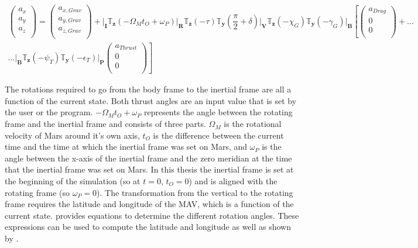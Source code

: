 \begin{multline} \label{eq:accModel}
\begin{pmatrix}
a_{x}\\
a_{y}\\
a_{z}\\
\end{pmatrix}
=
\begin{pmatrix}
a_{x,Grav}\\
a_{y,Grav}\\
a_{z,Grav}\\
\end{pmatrix}+
\Bigg|_{\mathbf{I}}\mathbb{T}_{\mathbf{z}}\left(-\Omega_{M}t_{O}+\omega_{P}\right)\Bigg|_{\mathbf{R}}\mathbb{T}_{\mathbf{z}}\left(-\tau\right)\mathbb{T}_{\mathbf{y}}\left(\dfrac{\pi}{2}+\delta\right)\Bigg|_{\mathbf{V}}\mathbb{T}_{\mathbf{z}}\left(-\chi_{G}\right)\mathbb{T}_{\mathbf{y}}\left(-\gamma_{G}\right)\Bigg|_{\mathbf{B}}\left[
\begin{pmatrix}
a_{Drag}\\
0\\
0\\
\end{pmatrix}
+  \right. \dots \\
\dotsc
 \left.
\Bigg|_{\mathbf{B}}\mathbb{T}_{\mathbf{z}}\left(-\psi_{T}\right)\mathbb{T}_{\mathbf{y}}\left(-\epsilon_{T}\right)\Bigg|_{\mathbf{P}}
\begin{pmatrix}
a_{Thrust}\\
0\\
0\\
\end{pmatrix}
\right]
\end{multline}

The rotations required to go from the body frame to the inertial frame are all a function of the current state. Both thrust angles are an input value that is set by the user or the program. $-\Omega_{M}t_{O}+\omega_{P}$ represents the angle between the rotating frame and the inertial frame and consists of three parts. $\Omega_{M}$ is the rotational velocity of Mars around it's own axis, $t_{O}$ is the difference between the current time and the time at which the inertial frame was set on Mars, and $\omega_{P}$ is the angle between the x-axis of the inertial frame and the zero meridian at the time that the inertial frame was set on Mars. In this thesis the inertial frame is set at the beginning of the simulation (so at $t=0$, $t_{O}=0$) and is aligned with the rotating frame (so $\omega_{P}=0$). The transformation from the vertical to the rotating frame requires the latitude and longitude of the \ac{MAV}, which is a function of the current state. \cite{mooij1994motion} provides equations to determine the different rotation angles. These expressions can be used to compute the latitude and longitude as well as shown by .

